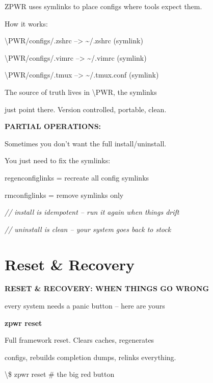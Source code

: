 \documentclass[11pt,a4paper,twoside]{book}
\begin{document}
ZPWR uses symlinks to place configs where tools expect them.

How it works:

\textbackslash{}PWR/configs/.zshrc  -->  \textasciitilde{}/.zshrc     (symlink)

\textbackslash{}PWR/configs/.vimrc  -->  \textasciitilde{}/.vimrc     (symlink)

\textbackslash{}PWR/configs/.tmux   -->  \textasciitilde{}/.tmux.conf (symlink)

The source of truth lives in \textbackslash{}PWR, the symlinks

just point there. Version controlled, portable, clean.


\vspace{12pt}
{\bfseries\color{neonyellow} PARTIAL OPERATIONS:}\vspace{4pt}

Sometimes you don't want the full install/uninstall.

You just need to fix the symlinks:

regenconfiglinks = recreate all config symlinks

rmconfiglinks    = remove symlinks only

{\small\itshape\color{dimtext} // install is idempotent -- run it again when things drift}

{\small\itshape\color{dimtext} // uninstall is clean -- your system goes back to stock}


\vspace{16pt}

\section{Reset \& Recovery}


\vspace{10pt}
{\large\bfseries\color{neoncyan} RESET \& RECOVERY: WHEN THINGS GO WRONG}\vspace{6pt}

every system needs a panic button -- here are yours


\vspace{12pt}
{\bfseries\color{neonyellow} zpwr reset}\vspace{4pt}

Full framework reset. Clears caches, regenerates

configs, rebuilds completion dumps, relinks everything.

\begin{codebox}
\textbackslash{}\$ zpwr reset                  \# the big red button\\
\end{codebox}
\end{document}
